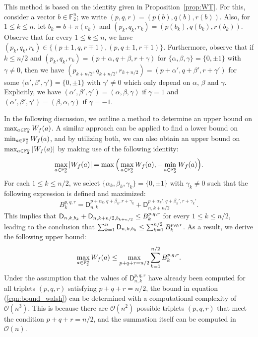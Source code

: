 \documentclass[11pt]{llncs}
\begin{document}
This method is based on the identity given in Proposition~\ref{prop:WT}.
For this, consider a vector $b\in\mathbb F_2^n$; we write $(p,q,r)=(p(b),q(b),r(b))$. Also, for $1\leq k\leq n$, let $b_k=b+\pi(e_k)$ and $(p_k,q_k,r_k)=(p(b_k),q(b_k),r(b_k))$. Observe that for every $1\leq k\leq n$, we have $(p_k,q_k,r_k)\in\{(p\pm1,q,r\mp 1),(p,q\pm 1,r\mp 1)\}$. Furthermore, observe that if $k\leq n/2$ and $(p_k,q_k,r_k)=(p+\alpha,q+\beta,r+\gamma)$ for $\{\alpha,\beta,\gamma\}=\{0,\pm 1\}$ with $\gamma\neq 0$, then we have $(p_{k+n/2},q_{k+n/2},r_{k+n/2})=(p+\alpha',q+\beta',r+\gamma')$ for some $\{\alpha',\beta',\gamma'\}=\{0,\pm 1\}$ with $\gamma'\neq 0$ which only depend on $\alpha$, $\beta$ and $\gamma$. Explicitly, we have $(\alpha',\beta',\gamma')=(\alpha,\beta,\gamma)$ if $\gamma=1$ and $(\alpha',\beta',\gamma')=(\beta,\alpha,\gamma)$ if $\gamma=-1$.

In the following discussion, we outline a method to determine an upper bound on $\max_{a\in\mathbb{F}_2^n}W_{f}(a)$. A similar approach can be applied to find a lower bound on $\min_{a\in\mathbb{F}_2^n}W_{f}(a)$, and by utilizing both, we can also obtain an upper bound on $\max_{a\in\mathbb{F}_2^n}|W_{f}(a)|$ by making use of the following identity:
\[
\max_{a\in\mathbb{F}_2^n}|W_{f}(a)|=\max\Big(\max_{a\in\mathbb{F}_2^n}W_{f}(a),-\min_{a\in\mathbb{F}_2^n}W_{f}(a)\Big).
\]
For each $1\leq k\leq n/2$, we select $\{\alpha_k,\beta_k,\gamma_k\}=\{0,\pm 1\}$ with $\gamma_k\neq 0$ such that the following expression is defined and maximized:
\[
B_k^{p,q,r}=\mathsf D_{n,k}^{p+\alpha_k,q+\beta_k,r+\gamma_k}+\mathsf D_{n,k+n/2}^{p+\alpha_k',q+\beta_k',r+\gamma_k'}.
\]
This implies that $\mathsf{D}_{n,k,b_k}+\mathsf{D}_{n,k+n/2,b_{k+n/2}}\leq B_k^{p,q,r}$ for every $1\leq k\leq n/2$, leading to the conclusion that $\sum_{k=1}^n\mathsf{D}_{n,k,b_k}\leq\sum_{k=1}^{n/2} B_k^{p,q,r}$. As a result, we derive the following upper bound:
\begin{equation}\label{eqn:bound_walsh}
\max_{a\in\mathbb{F}_2^n}W_{f}(a)\leq\max_{p+q+r=n/2}\sum_{k=1}^{n/2} B_k^{p,q,r}.
\end{equation}
Under the assumption that the values of $\mathsf{D}_{n,k}^{p,q,r}$ have already been computed for all triplets $(p,q,r)$ satisfying $p+q+r=n/2$, the bound in equation (\ref{eqn:bound_walsh}) can be determined with a computational complexity of $\mathcal{O}(n^3)$. This is because there are $\mathcal{O}(n^2)$ possible triplets $(p,q,r)$ that meet the condition $p+q+r=n/2$, and the summation itself can be computed in $\mathcal{O}(n)$.
\end{document}
